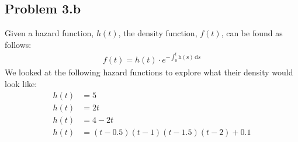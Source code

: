 \documentclass[letter]{article}
\begin{document}
\subsection*{Problem 3.b}
Given a hazard function, $h(t)$, the density function, $f(t)$, can be found as follows:
\begin{equation*}
  \begin{aligned}
      f(t) = h(t) \cdot e^{-\int_0^t \mathrm{h(s)}\,\mathrm{d}s}
  \end{aligned}
\end{equation*}
We looked at the following hazard functions to explore what their density would look like:
\begin{equation*}
  \begin{aligned}
      h(t) &= 5 \\
      h(t) &= 2t \\
      h(t) &= 4 - 2t  \\
      h(t) &= (t-0.5)(t-1)(t-1.5)(t-2) + 0.1\\
  \end{aligned}
\end{equation*}
\end{document}
